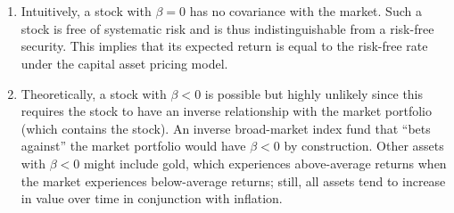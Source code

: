 \documentclass[12pt]{article}
\begin{document}
\section{}
\begin{enumerate}
    \item Intuitively, a stock with $\beta=0$ has no covariance with the market. Such a stock is free of systematic risk and is thus indistinguishable from a risk-free security. This implies that its expected return is equal to the risk-free rate under the capital asset pricing model.
    \item Theoretically, a stock with $\beta<0$ is possible but highly unlikely since this requires the stock to have an inverse relationship with the market portfolio (which contains the stock). An inverse broad-market index fund that ``bets against'' the market portfolio would have $\beta<0$ by construction. Other assets with $\beta<0$ might include gold, which experiences above-average returns when the market experiences below-average returns; still, all assets tend to increase in value over time in conjunction with inflation.
\end{enumerate}
\end{document}
